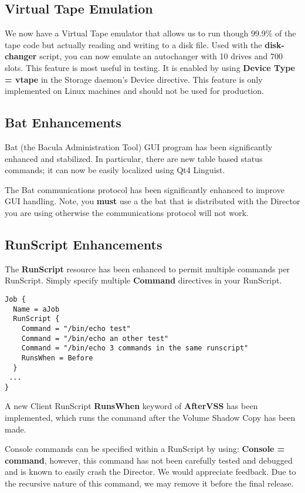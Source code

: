 \subsection{Virtual Tape Emulation}
We now have a Virtual Tape emulator that allows us to run though 99.9\% of
the tape code but actually reading and writing to a disk file. Used with the
\textbf{disk-changer} script, you can now emulate an autochanger with 10 drives
and 700 slots. This feature is most useful in testing.  It is enabled
by using {\bf Device Type = vtape} in the Storage daemon's Device
directive. This feature is only implemented on Linux machines and should not be
used for production.

\subsection{Bat Enhancements}
Bat (the Bacula Administration Tool) GUI program has been significantly
enhanced and stabilized. In particular, there are new table based status 
commands; it can now be easily localized using Qt4 Linguist.

The Bat communications protocol has been significantly enhanced to improve
GUI handling. Note, you {\bf must} use a the bat that is distributed with
the Director you are using otherwise the communications protocol will not
work.

\subsection{RunScript Enhancements}
The {\bf RunScript} resource has been enhanced to permit multiple
commands per RunScript.  Simply specify multiple {\bf Command} directives
in your RunScript.

\begin{verbatim}
Job {
  Name = aJob
  RunScript {
    Command = "/bin/echo test"
    Command = "/bin/echo an other test"
    Command = "/bin/echo 3 commands in the same runscript"
    RunsWhen = Before
  }
 ...
}
\end{verbatim}

A new Client RunScript {\bf RunsWhen} keyword of {\bf AfterVSS} has been
implemented, which runs the command after the Volume Shadow Copy has been made.

Console commands can be specified within a RunScript by using:
{\bf Console = \lt{}command\gt{}}, however, this command has not been 
carefully tested and debugged and is known to easily crash the Director.
We would appreciate feedback.  Due to the recursive nature of this command, we
may remove it before the final release.

